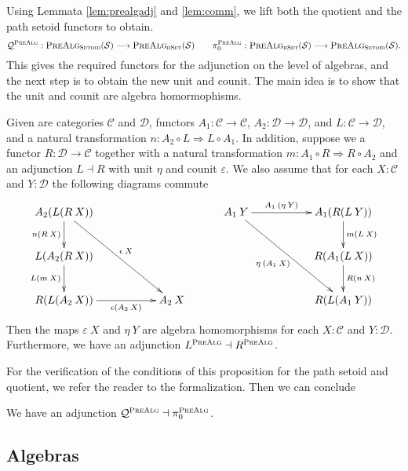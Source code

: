 \documentclass[9pt]{entcs}
\newcommand{\type}[1]{\textsc{#1}}
\newcommand{\category}[1]{\textsc{#1}}
\newcommand{\hset}{\type{hSet}} %
\newcommand{\0}{\textbf{0}} %
\newcommand{\setoids}{\category{Setoid}} %
\newcommand{\functor}[2]{#1 \longrightarrow #2} %
\newcommand{\compf}[2]{#2 \circ #1} %
\newcommand{\nattrans}[2]{#1 \Longrightarrow #2} %
\newcommand{\adj}[2]{#1 \dashv #2} %
\newcommand{\sig}{\mathcal{S}} %
\newcommand{\prealg}[1]{\category{PreAlg}_{\hset}(#1)} %
\newcommand{\prealgst}[1]{\category{PreAlg}_{\setoids}(#1)} %
\newcommand{\quotPA}{\mathcal{Q}^{\category{PreAlg}}}
\newcommand{\pathPA}{\pi^{\category{PreAlg}}_0}
\begin{document}
Using Lemmata \ref{lem:prealgadj} and \ref{lem:comm}, we lift both the quotient and the path setoid functors to obtain.
\[
\quotPA : \functor{\prealgst{\sig}}{\prealg{\sig}}
\quad \quad
\pathPA : \functor{\prealg{\sig}}{\prealgst{\sig}}.
\]
This gives the required functors for the adjunction on the level of algebras, and the next step is to obtain the new unit and counit.
The main idea is to show that the unit and counit are algebra homormophisms.

\begin{proposition}
\label{lem:prealgadjconstr}
Given are categories $\mathcal{C}$ and $\mathcal{D}$, functors $A_1 : \functor{\mathcal{C}}{\mathcal{C}}$, $A_2 : \functor{\mathcal{D}}{\mathcal{D}}$, and $L : \functor{\mathcal{C}}{\mathcal{D}}$, and a natural transformation $n : \nattrans{\compf{L}{A_2}}{\compf{A_1}{L}}$.
In addition, suppose we a functor $R : \functor{\mathcal{D}}{\mathcal{C}}$ together with a natural transformation $m : \nattrans{\compf{R}{A_1}}{\compf{A_2}{R}}$ and an adjunction $\adj{L}{R}$ with unit $\eta$ and counit $\varepsilon$.
We also assume that for each $X : \mathcal{C}$ and $Y : \mathcal{D}$ the following diagrams commute
\[
\xymatrix
{	
	A_2 (L(R \> X)) \ar[ddrr]^{\epsilon \> X} \ar[d]_{n(R \> X)} \\
	L(A_2(R \> X)) \ar[d]_{L(m \> X)} \\
	R(L(A_2 \> X)) \ar[rr]_-{\epsilon(A_2 \> X)} & & A_2 \> X
}
\quad \quad \quad
\xymatrix
{
	A_1 \> Y \ar[ddrr]_{\eta \> (A_1 \> X)} \ar[rr]^-{A_1 \> (\eta \> Y)} & & A_1(R(L \> Y)) \ar[d]^{m(L \> X)}\\
	& & R(A_1(L \> X)) \ar[d]^{R(n \> X)}\\
	& & R(L(A_1 \> Y))
}
\]
Then the maps $\varepsilon \> X$ and $\eta \> Y$ are algebra homomorphisms for each $X : \mathcal{C}$ and $Y : \mathcal{D}$.
Furthermore, we have an adjunction $\adj{L^{\category{PreAlg}}}{R^{\category{PreAlg}}}$.
\end{proposition}

For the verification of the conditions of this proposition for the path setoid and quotient, we refer the reader to the formalization.
Then we can conclude

\begin{lemma}
\label{lem:adjprealg}
We have an adjunction $\adj{\quotPA}{\pathPA}$.
\end{lemma}

\subsection{Algebras}
\end{document}
